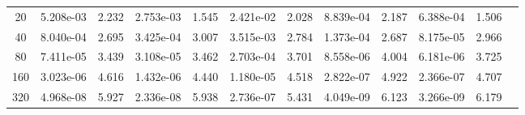 \documentclass[english]{article}
\theoremstyle{thmstyleone}
\theoremstyle{thmstyletwo}
\theoremstyle{thmstylethree}
\begin{document}
\begin{table}[ht]
\begin{adjustbox}{width=1\textwidth}
\begin{subtable}{1.\linewidth}
\begin{tabular}{cccccccccccc}
				20 & 5.208e-03 & 2.232 & 2.753e-03 & 1.545 & 2.421e-02 & 2.028 & 8.839e-04 & 2.187 & 6.388e-04 & 1.506 \\
				40 & 8.040e-04 & 2.695 & 3.425e-04 & 3.007 & 3.515e-03 & 2.784 & 1.373e-04 & 2.687 & 8.175e-05 & 2.966 \\
				80 & 7.411e-05 & 3.439 & 3.108e-05 & 3.462 & 2.703e-04 & 3.701 & 8.558e-06 & 4.004 & 6.181e-06 & 3.725 \\
				160 & 3.023e-06 & 4.616 & 1.432e-06 & 4.440 & 1.180e-05 & 4.518 & 2.822e-07 & 4.922 & 2.366e-07 & 4.707 \\
				320 & 4.968e-08 & 5.927 & 2.336e-08 & 5.938 & 2.736e-07 & 5.431 & 4.049e-09 & 6.123 & 3.266e-09 & 6.179 \\
				\bottomrule
			\end{tabular}
		\end{subtable}
	\end{adjustbox}
\end{table}
\end{document}
